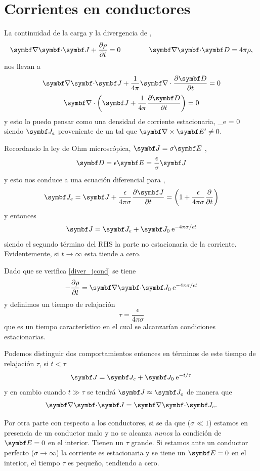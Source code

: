 \documentclass[10pt,oneside]{CBFT_book}
\begin{document}
\section{Corrientes en conductores}

La continuidad de la carga y la divergencia de ,
\[
	\divem{J} + \dpar{\rho}{t} = 0 \qquad \qquad \divem{D} = 4\pi \rho,
\]
nos llevan a
\[
	\divem{J} + \frac{1}{4\pi}\Nabla\cdot \dpar{\vb{D}}{t} = 0
\]
\[
	\Nabla\cdot \left( \vb{J} + \frac{1}{4\pi} \dpar{\vb{D}}{t} \right) = 0
\]
y esto lo puedo pensar como una densidad de corriente estacionaria,
\be
	_e = 0
	\label{diver_jcond}
\ee
siendo $\vb{J}_e$ proveniente de un  tal que $\rotorm{E'} \neq 0$.

Recordando la ley de Ohm microscópica, $\vb{J} = \sigma \vb{E}$ ,
\[
	\vb{D} = \epsilon \vb{E} = \frac{\epsilon}{\sigma} \vb{J}
\]
y esto nos conduce a una ecuación diferencial para ,
\[
	\vb{J}_e = \vb{J} + \frac{\epsilon}{4\pi\sigma} \dpar{\vb{J}}{t} =
	\left( 1 + \frac{\epsilon}{4\pi\sigma} \dpar{}{t} \right)
\]
y entonces 
\[
	\vb{J} = \vb{J}_e + \vb{J}_0 \euler^{-4\pi\sigma/\epsilon t }
\]
siendo el segundo término del RHS la parte no estacionaria de la corriente. Evidentemente, si $t \to \infty$ esta 
tiende a cero.

Dado que se verifica \eqref{diver_jcond} se tiene 
\[
	-\dpar{\rho}{t} = \divem{J}_0 \euler^{-4\pi \sigma/\epsilon t}
\]
y definimos un tiempo de relajación
\[
	\tau = \frac{\epsilon}{4\pi\sigma}
\]
que es un tiempo característico en el cual se alcanzarían condiciones estacionarias.

Podemos distinguir dos comportamientos entonces en términos de este tiempo de relajación $\tau$, si $t<\tau$
\[
	\vb{J} = \vb{J}_e + \vb{J}_0 \euler^{-t/\tau}
\]
y en cambio cuando $t \gg \tau$ se tendrá $\vb{J} \approx \vb{J}_e$ de manera que 
\[
	\divem{J} = \divem{J}_e.
\]

Por otra parte con respecto a los conductores, si se da que  ($\sigma \ll 1$) estamos en presencia de un conductor malo 
y no se alcanza {\it nunca} la condición de $\vb{E}=0$ en el interior. Tienen un $\tau$ grande. Si estamos ante un 
conductor perfecto ($\sigma \to \infty$) la corriente es estacionaria y se tiene un $\vb{E}=0$ en el interior, el 
tiempo $\tau$ es pequeño, tendiendo a cero.
\end{document}
